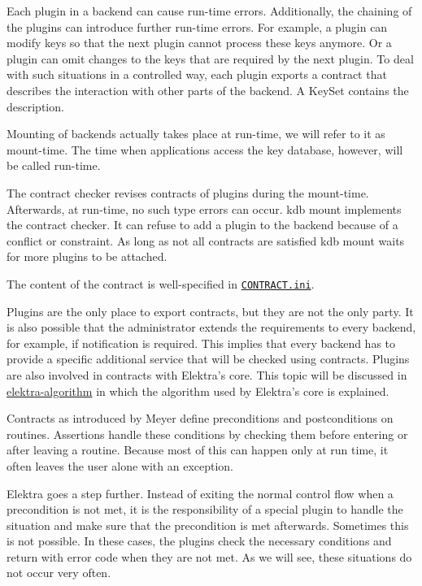 Each plugin in a backend can cause run-\/time errors. Additionally, the chaining of the plugins can introduce further run-\/time errors. For example, a plugin can modify keys so that the next plugin cannot process these keys anymore. Or a plugin can omit changes to the keys that are required by the next plugin. To deal with such situations in a controlled way, each plugin exports a contract that describes the interaction with other parts of the backend. A {\ttfamily Key\+Set} contains the description.

Mounting of backends actually takes place at run-\/time, we will refer to it as mount-\/time. The time when applications access the key database, however, will be called run-\/time.

The contract checker revises contracts of plugins during the mount-\/time. Afterwards, at run-\/time, no such type errors can occur. {\ttfamily kdb mount} implements the contract checker. It can refuse to add a plugin to the backend because of a conflict or constraint. As long as not all contracts are satisfied {\ttfamily kdb mount} waits for more plugins to be attached.

The content of the contract is well-\/specified in \href{/home/markus/Projekte/Elektra/current/doc/CONTRACT.ini}{\tt C\+O\+N\+T\+R\+A\+C\+T.\+ini}.

Plugins are the only place to export contracts, but they are not the only party. It is also possible that the administrator extends the requirements to every backend, for example, if notification is required. This implies that every backend has to provide a specific additional service that will be checked using contracts. Plugins are also involved in contracts with Elektra’s core. This topic will be discussed in \hyperlink{doc_dev_algorithm_md}{elektra-\/algorithm} in which the algorithm used by Elektra’s core is explained.

Contracts as introduced by Meyer define preconditions and postconditions on routines. Assertions handle these conditions by checking them before entering or after leaving a routine. Because most of this can happen only at run time, it often leaves the user alone with an exception.

Elektra goes a step further. Instead of exiting the normal control flow when a precondition is not met, it is the responsibility of a special plugin to handle the situation and make sure that the precondition is met afterwards. Sometimes this is not possible. In these cases, the plugins check the necessary conditions and return with error code when they are not met. As we will see, these situations do not occur very often.

